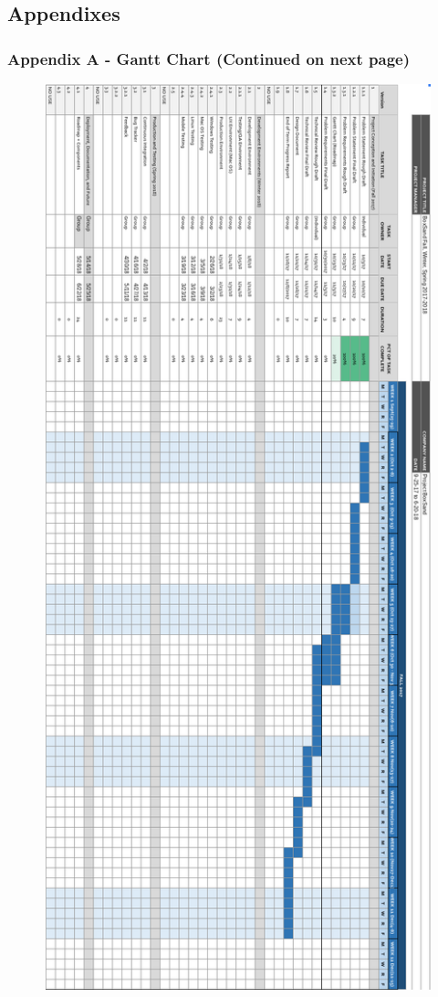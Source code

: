 \documentclass[onecolumn, draftclsnofoot,10pt, compsoc]{IEEEtran}
\begin{document}
\subsection{Appendixes}

\subsubsection{Appendix A - Gantt Chart (Continued on next page)}
\newpage
\begin{landscape}
\begin{figure}
 \centering 
  \includegraphics[angle=-90,width=\textwidth]{gantt.png}
\end{figure}
\end{landscape}
\end{document}
